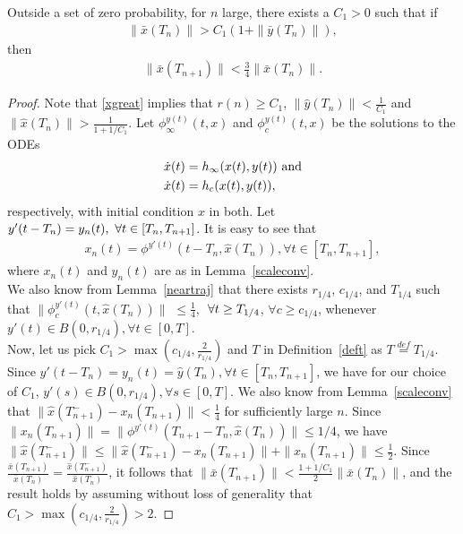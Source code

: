 \begin{lemma}\label{lemmt}
Outside a set of zero probability, for $n$ large, there exists a $C_1>0$ such that if
\begin{align}\label{xgreat}
\parallel \bar{x}(T_n)\parallel >C_1(1+\parallel \bar{y}(T_n)\parallel),
\end{align}
 then 
\begin{align}
\parallel \bar{x}(T_{n+1})\parallel < \frac{3}{4}\parallel \bar{x}(T_{n})\parallel.
\end{align}
\end{lemma}
\begin{proof}
Note that \eqref{xgreat} implies that $r(n)\geq C_1$, $\parallel \hat{y}(T_n)\parallel <\frac{1}{C_1}$ and 
$\parallel \hat{x}(T_n)\parallel >\frac{1}{1+1/C_1}$. Let $\phi^{y(t)}_\infty(t,x)$ and $\phi^{y(t)}_c(t,x)$ 
be the solutions to the ODEs \begin{align}
\label{iode}\dot{x}(t)&=h_\infty(x(t),y(t)) \text{\mbox{ }and}\\
\label{code}\dot{x}(t)&=h_c(x(t),y(t)),
\end{align}
respectively, with initial condition $x$ in both. Let $y'(t-T_n)=y_n(t), \mbox{ } \forall t \in [T_n,T_{n+1}]$. 
It is easy to see that 
\begin{align}\label{equal}
x_n(t)=\phi^{y'(t)}(t-T_n,\hat{x}(T_n)), \forall t\in [T_n,T_{n+1}],
\end{align}
where $x_n(t)$ and $y_n(t)$ are as in Lemma~\ref{scaleconv}.\\
We also know from Lemma~\ref{neartraj} that there exists $r_{1/4}$, $c_{1/4}$, and $T_{1/4}$ such that  
$\parallel \phi^{y'(t)}_c(t,\hat{x}(T_n))\parallel$ $\leq \frac{1}{4}$, $\mbox{ }\forall t \geq T_{1/4}$, 
 $\forall c \geq c_{1/4}$, whenever $y'(t) \in B(0,r_{1/4}), \forall t \in [0,T]$.\\ 
Now, let us pick $C_1>\max(c_{1/4},\frac{2}{r_{1/4}})$ and $T$ in Definition~\ref{deft} as $T\stackrel{def}{=}T_{1/4}$. Since $y'(t-T_n)=y_n(t)=\hat{y}(T_n), \forall t \in [T_n,T_{n+1}]$, we have for our choice of $C_1$, $y'(s)\in  B(0,r_{1/4}), \forall s \in [0,T]$. We also know from Lemma~\ref{scaleconv} that $\parallel 
\hat{x}(T^{-}_{n+1})-x_n(T_{n+1})\parallel <\frac{1}{4}$ for sufficiently large $n$. 
Since $\parallel x_n(T_{n+1})\parallel=\parallel \phi^{y'(t)}(T_{n+1}-T_n,\hat{x}(T_n))\parallel\leq 1/4$, 
we have $\parallel \hat{x}(T^{-}_{n+1})\parallel \leq \parallel \hat{x}(T^{-}_{n+1})-x_n(T_{n+1})\parallel
+\parallel x_n(T_{n+1})\parallel \leq \frac{1}{2}$. Since $\frac{\bar{x}(T_{n+1})}{\bar{x}(T_{n})}=\frac{\hat{x}(T^{-}_{n+1})}{\hat{x}(T_{n})}$, it follows that $\parallel \bar{x}(T^{}_{n+1})\parallel <\frac{1+1/C_1}{2}
\parallel \bar{x}(T_n)\parallel$, and the result holds by assuming without loss of generality that 
$C_1>\max(c_{1/4},\frac{2}{r_{1/4}})>2$.
\end{proof}
